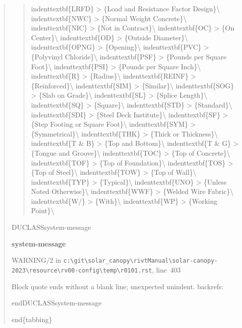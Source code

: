 \documentclass[12pt,notitle,letterpaper]{report}
\newenvironment{DUclass}[1]%
  {%
   \def\DocutilsClassFunctionName{DUCLASS#1}
     \csname \DocutilsClassFunctionName \endcsname}%
  {\csname end\DocutilsClassFunctionName \endcsname}%
\newenvironment{DUadmonition}%
  {\begin{center}
     \begin{lrbox}{\DUadmonitionbox}
       \begin{minipage}{0.9\linewidth}
  }%
  {    \end{minipage}
     \end{lrbox}
     \fbox{\usebox{\DUadmonitionbox}}
   \end{center}
  }
\providecommand*{\DUtitle}[1]{%
  \smallskip\noindent\textbf{#1}\smallskip}
\begin{document}
\begin{quote}
\begin{quote}
indenttextbf\{LRFD\}     >  \{Load and Resistance Factor Design\}\textbackslash{}
indenttextbf\{NWC\}      >  \{Normal Weight Concrete\}\textbackslash{}
indenttextbf\{NIC\}      >  \{Not in Contract\}\textbackslash{}
indenttextbf\{OC\}       >  \{On Center\}\textbackslash{}
indenttextbf\{OD\}       >  \{Outside Diameter\}\textbackslash{}
indenttextbf\{OPNG\}     >  \{Opening\}\textbackslash{}
indenttextbf\{PVC\}      >  \{Polyvinyl Chloride\}\textbackslash{}
indenttextbf\{PSF\}      >  \{Pounds per Square Foot\}\textbackslash{}
indenttextbf\{PSI\}      >  \{Pounds per Square Inch\}\textbackslash{}
indenttextbf\{R\}        >  \{Radius\}\textbackslash{}
indenttextbf\{REINF\}    >  \{Reinforced\}\textbackslash{}
indenttextbf\{SIM\}      >  \{Similar\}\textbackslash{}
indenttextbf\{SOG\}      >  \{Slab on Grade\}\textbackslash{}
indenttextbf\{SL\}       >  \{Splice Length\}\textbackslash{}
indenttextbf\{SQ\}       >  \{Square\}\textbackslash{}
indenttextbf\{STD\}      >  \{Standard\}\textbackslash{}
indenttextbf\{SDI\}      >  \{Steel Deck Institute\}\textbackslash{}
indenttextbf\{SF\}       >  \{Step Footing or Square Foot\}\textbackslash{}
indenttextbf\{SYM\}      >  \{Symmetrical\}\textbackslash{}
indenttextbf\{THK\}      >  \{Thick or Thickness\}\textbackslash{}
indenttextbf\{T \& B\}   >  \{Top and Bottom\}\textbackslash{}
indenttextbf\{T \& G\}   >  \{Tongue and Groove\}\textbackslash{}
indenttextbf\{TOC\}      >  \{Top of Concrete\}\textbackslash{}
indenttextbf\{TOF\}      >  \{Top of Foundation\}\textbackslash{}
indenttextbf\{TOS\}      >  \{Top of Steel\}\textbackslash{}
indenttextbf\{TOW\}      >  \{Top of Wall\}\textbackslash{}
indenttextbf\{TYP\}      >  \{Typical\}\textbackslash{}
indenttextbf\{UNO\}      >  \{Unless Noted Otherwise\}\textbackslash{}
indenttextbf\{WWF\}      >  \{Welded Wire Fabric\}\textbackslash{}
indenttextbf\{W/\}       >  \{With\}\textbackslash{}
indenttextbf\{WP\}       >  \{Working Point\}\textbackslash{}
\end{quote}

\begin{DUclass}{system-message}
\begin{DUadmonition}
\DUtitle{system-message
}

{\color{red}WARNING/2} in \texttt{c:\textbackslash{}git\textbackslash{}solar\_canopy\textbackslash{}rivtManual\textbackslash{}solar-canopy-2023\textbackslash{}resource\textbackslash{}rv00-config\textbackslash{}temp\textbackslash{}r0101.rst}, line~403

Block quote ends without a blank line; unexpected unindent.
backrefs: \end{DUadmonition}
\end{DUclass}

end\{tabbing\}
\end{quote}
\end{document}
